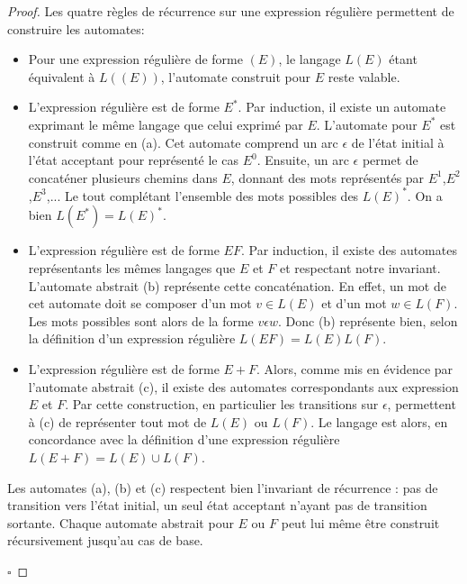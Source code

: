 \begin{proof}
	Les quatre règles de récurrence sur une expression régulière permettent de construire les automates:
	\begin{itemize}
		\item Pour une expression régulière de forme $(E)$, le langage $L(E)$ étant équivalent à $L((E))$, l'automate construit pour $E$ reste valable.
		\item L'expression régulière est de forme $E^*$. Par induction, il existe un automate exprimant le même langage que celui exprimé par $E$. L'automate pour $E^*$ est construit comme en (a). Cet automate comprend un arc $\epsilon$ de l'état initial à l'état acceptant pour représenté le cas $E^0$. Ensuite, un arc $\epsilon$ permet de concaténer plusieurs chemins dans $E$, donnant des mots représentés par $E^1$,$E^2$,$E^3$,... Le tout complétant l'ensemble des mots possibles des $L(E)^*$. On a bien $L(E^*)=L(E)^*$.
		\item L'expression régulière est de forme $EF$. Par induction, il existe des automates représentants les mêmes langages que $E$ et $F$ et respectant notre invariant. L'automate abstrait (b) représente cette concaténation. En effet, un mot de cet automate doit se composer d'un mot $v\in L(E)$ et d'un mot $w \in L(F)$. Les mots possibles sont alors de la forme $v\epsilon w$. Donc (b) représente bien, selon la définition d'un expression régulière $L(EF)=L(E)L(F)$.
		\item L'expression régulière est de forme $E+F$. Alors, comme mis en évidence par l'automate abstrait (c), il existe des automates correspondants aux expression $E$ et $F$. Par cette construction, en particulier les transitions sur $\epsilon$, permettent à (c) de représenter tout mot de $L(E)$ ou $L(F)$. Le langage est alors, en concordance avec la définition d'une expression régulière $L(E+F)=L(E)\cup L(F)$.
	\end{itemize}

	Les automates (a), (b) et (c) respectent bien l'invariant de récurrence : pas de transition vers l'état initial, un seul état acceptant n'ayant pas de transition sortante. Chaque automate abstrait pour $E$ ou $F$ peut lui même être construit récursivement jusqu'au cas de base.

	\hfill$\square$
\end{proof}
